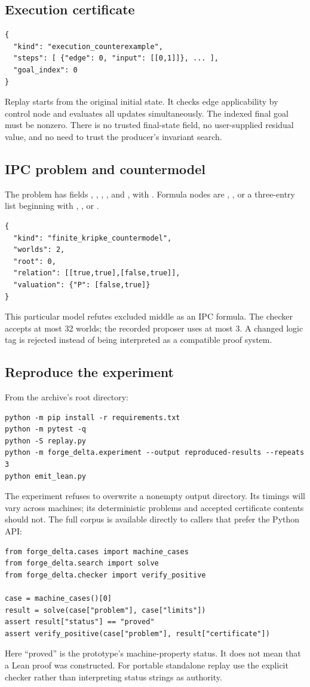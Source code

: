 \subsection{Execution certificate}
\begin{lstlisting}
{
  "kind": "execution_counterexample",
  "steps": [ {"edge": 0, "input": [[0,1]]}, ... ],
  "goal_index": 0
}
\end{lstlisting}
Replay starts from the original initial state. It checks edge applicability by
control node and evaluates all updates simultaneously. The indexed final goal
must be nonzero. There is no trusted final-state field, no user-supplied
residual value, and no need to trust the producer's invariant search.

\subsection{IPC problem and countermodel}
The problem has fields , , ,
, and , with . Formula nodes are
, \code{["bot"]}, or a three-entry list beginning with
, , or .
\begin{lstlisting}
{
  "kind": "finite_kripke_countermodel",
  "worlds": 2,
  "root": 0,
  "relation": [[true,true],[false,true]],
  "valuation": {"P": [false,true]}
}
\end{lstlisting}
This particular model refutes excluded middle as an IPC formula. The checker
accepts at most 32 worlds; the recorded proposer uses at most 3. A changed logic
tag is rejected instead of being interpreted as a compatible proof system.

\subsection{Reproduce the experiment}
From the archive's root directory:
\begin{lstlisting}
python -m pip install -r requirements.txt
python -m pytest -q
python -S replay.py
python -m forge_delta.experiment --output reproduced-results --repeats 3
python emit_lean.py
\end{lstlisting}
The experiment refuses to overwrite a nonempty output directory. Its timings
will vary across machines; its deterministic problems and accepted certificate
contents should not. The full corpus is available directly to callers that
prefer the Python API:
\begin{lstlisting}
from forge_delta.cases import machine_cases
from forge_delta.search import solve
from forge_delta.checker import verify_positive

case = machine_cases()[0]
result = solve(case["problem"], case["limits"])
assert result["status"] == "proved"
assert verify_positive(case["problem"], result["certificate"])
\end{lstlisting}
Here ``proved'' is the prototype's machine-property status. It does not mean
that a Lean proof was constructed. For portable standalone replay use the
explicit checker rather than interpreting status strings as authority.

